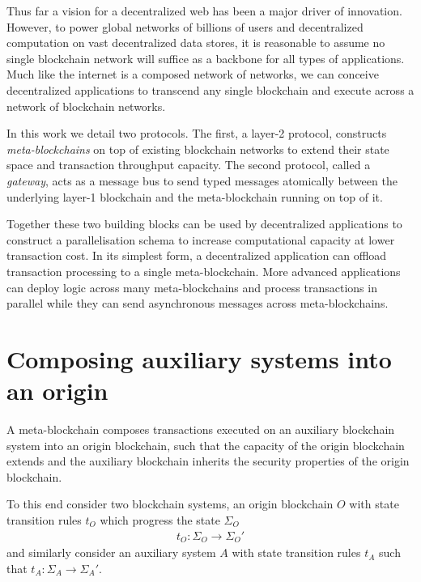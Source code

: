 \documentclass[12pt,a4paper]{article}
\begin{document}

Thus far a vision for a decentralized web has been a major driver of innovation.
However, to power global networks of billions of users and decentralized computation on vast decentralized data stores, it is reasonable to assume no single blockchain network will suffice as a backbone for all types of applications.
Much like the internet is a composed network of networks, we can conceive decentralized applications to transcend any single blockchain and execute across a network of blockchain networks.

In this work we detail two protocols.
The first, a layer-2 protocol, constructs \emph{meta-blockchains} on top of existing blockchain networks to extend their state space and transaction throughput capacity.
The second protocol, called a \emph{gateway}, acts as a message bus to send typed messages atomically between the underlying layer-1 blockchain and the meta-blockchain running on top of it.

Together these two building blocks can be used by decentralized applications to construct a parallelisation schema to increase %
computational capacity at lower transaction cost.
In its simplest form, a decentralized application can offload transaction processing to a single meta-blockchain.
More advanced applications can deploy logic across many meta-blockchains and process transactions in parallel while they can send asynchronous messages across meta-blockchains.



\section{Composing auxiliary systems into an origin}

A meta-blockchain composes transactions executed on an auxiliary blockchain system into an origin blockchain, such that the capacity of the origin blockchain extends and the auxiliary blockchain inherits the security properties of the origin blockchain.

To this end consider two blockchain systems, an origin blockchain $O$ with state transition rules $t_O$ which progress the state $\Sigma_O$ 
\begin{align} \label{state_transition_rules}
  t_O : \Sigma_O \rightarrow \Sigma_O'
\end{align}
and similarly consider an auxiliary system $A$ with state transition rules $t_A$ such that $t_A : \Sigma_A \rightarrow \Sigma_A'$.
\end{document}
